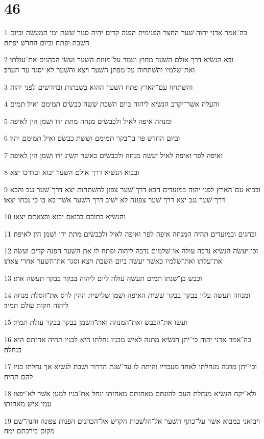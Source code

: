 \chapter{46}

\par 1 כה־אמר אדני יהוה שׁער החצר הפנימית הפנה קדים יהיה סגור שׁשׁת ימי המעשׂה וביום השׁבת יפתח וביום החדשׁ יפתח׃
\par 2 ובא הנשׂיא דרך אולם השׁער מחוץ ועמד על־מזוזת השׁער ועשׂו הכהנים את־עולתו ואת־שׁלמיו והשׁתחוה על־מפתן השׁער ויצא והשׁער לא־יסגר עד־הערב׃
\par 3 והשׁתחוו עם־הארץ פתח השׁער ההוא בשׁבתות ובחדשׁים לפני יהוה׃
\par 4 והעלה אשׁר־יקרב הנשׂיא ליהוה ביום השׁבת שׁשׁה כבשׂים תמימם ואיל תמים׃
\par 5 ומנחה איפה לאיל ולכבשׂים מנחה מתת ידו ושׁמן הין לאיפה׃
\par 6 וביום החדשׁ פר בן־בקר תמימם ושׁשׁת כבשׂם ואיל תמימם יהיו׃
\par 7 ואיפה לפר ואיפה לאיל יעשׂה מנחה ולכבשׂים כאשׁר תשׂיג ידו ושׁמן הין לאיפה׃
\par 8 ובבוא הנשׂיא דרך אולם השׁער יבוא ובדרכו יצא׃
\par 9 ובבוא עם־הארץ לפני יהוה במועדים הבא דרך־שׁער צפון להשׁתחות יצא דרך־שׁער נגב והבא דרך־שׁער נגב יצא דרך־שׁער צפונה לא ישׁוב דרך השׁער אשׁר־בא בו כי נכחו יצאו׃
\par 10 והנשׂיא בתוכם בבואם יבוא ובצאתם יצאו׃
\par 11 ובחגים ובמועדים תהיה המנחה איפה לפר ואיפה לאיל ולכבשׂים מתת ידו ושׁמן הין לאיפה׃
\par 12 וכי־יעשׂה הנשׂיא נדבה עולה או־שׁלמים נדבה ליהוה ופתח לו את השׁער הפנה קדים ועשׂה את־עלתו ואת־שׁלמיו כאשׁר יעשׂה ביום השׁבת ויצא וסגר את־השׁער אחרי צאתו׃
\par 13 וכבשׂ בן־שׁנתו תמים תעשׂה עולה ליום ליהוה בבקר בבקר תעשׂה אתו׃
\par 14 ומנחה תעשׂה עליו בבקר בבקר שׁשׁית האיפה ושׁמן שׁלישׁית ההין לרס את־הסלת מנחה ליהוה חקות עולם תמיד׃
\par 15 ועשׂו את־הכבשׂ ואת־המנחה ואת־השׁמן בבקר בבקר עולת תמיד׃
\par 16 כה־אמר אדני יהוה כי־יתן הנשׂיא מתנה לאישׁ מבניו נחלתו היא לבניו תהיה אחזתם היא בנחלה׃
\par 17 וכי־יתן מתנה מנחלתו לאחד מעבדיו והיתה לו עד־שׁנת הדרור ושׁבת לנשׂיא אך נחלתו בניו להם תהיה׃
\par 18 ולא־יקח הנשׂיא מנחלת העם להונתם מאחזתם מאחזתו ינחל את־בניו למען אשׁר לא־יפצו עמי אישׁ מאחזתו׃
\par 19 ויביאני במבוא אשׁר על־כתף השׁער אל־הלשׁכות הקדשׁ אל־הכהנים הפנות צפונה והנה־שׁם מקום בירכתם ימה׃
